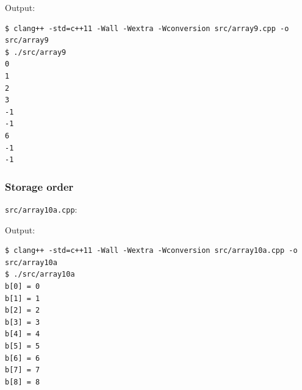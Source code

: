 \documentclass[12pt,letterpaper,twoside]{article}
\begin{document}
Output:

\begin{verbatim}
$ clang++ -std=c++11 -Wall -Wextra -Wconversion src/array9.cpp -o src/array9
$ ./src/array9
0
1
2
3
-1
-1
6
-1
-1
\end{verbatim}

\hypertarget{storage-order}{%
\subsubsection{Storage order}\label{storage-order}}

\texttt{src/array10a.cpp}:

\begin{Shaded}
\begin{Highlighting}[]

  \NormalTok{, }\NormalTok{extents[}\NormalTok{][}\NormalTok{]);}

  \NormalTok{;}
  \NormalTok{ (} 
    \NormalTok{ (} 
\NormalTok{    \}}
\NormalTok{  \}}

  \NormalTok{ (} 
    \StringTok{"b["}\StringTok{"] = "}
\NormalTok{  \}}

   \NormalTok{;}
\NormalTok{\}}
\end{Highlighting}
\end{Shaded}

Output:

\begin{verbatim}
$ clang++ -std=c++11 -Wall -Wextra -Wconversion src/array10a.cpp -o src/array10a
$ ./src/array10a
b[0] = 0
b[1] = 1
b[2] = 2
b[3] = 3
b[4] = 4
b[5] = 5
b[6] = 6
b[7] = 7
b[8] = 8
\end{verbatim}
\end{document}
